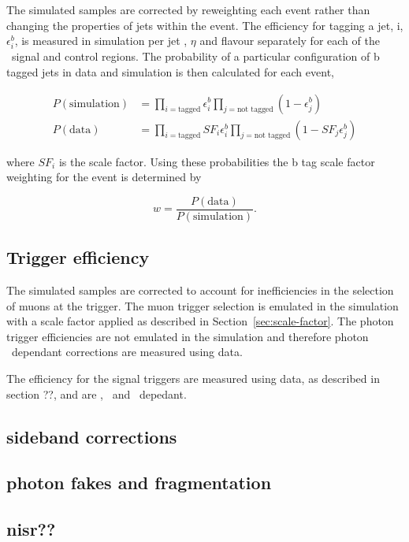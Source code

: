 The simulated samples are corrected by reweighting
each event rather than changing the properties of jets within the event. 
The efficiency for tagging a jet, i, $\epsilon_{i}^{b}$, is measured in simulation per 
jet \pt, $\eta$ and flavour separately for each of the 
\alphat~signal and control regions. The probability of a particular configuration 
of b tagged jets in data and simulation is then calculated for each event,

\begin{align}
P(\text{simulation}) &= \prod_{i=\text{tagged}} \epsilon^{b}_{i} \prod_{j=\text{not tagged}} (1-\epsilon^{b}_{j})\\
P(\text{data}) &= \prod_{i=\text{tagged}} SF_{i}\epsilon^{b}_{i} \prod_{j=\text{not tagged}} (1-SF_{j}\epsilon^{b}_{j})
\end{align}

where $SF_{i}$ is the scale factor. Using these probabilities the b tag scale factor weighting for the event is 
determined by

\begin{equation}
w = \frac{P(\text{data})}{P(\text{simulation})}.
\end{equation}

\subsection{Trigger efficiency}

The simulated samples are corrected to account for inefficiencies in the selection of muons
at the trigger. The muon trigger selection is emulated in the simulation with a scale factor
applied as described in Section~\ref{sec:scale-factor}. The photon trigger efficiencies
are not emulated in the simulation and therefore photon \pt~dependant corrections are measured 
using data. 

The efficiency for the signal triggers are measured using data, as described 
in section ??, and are \scalht, \njet~and \mht~depedant.

\subsection{sideband corrections}
\subsection{photon fakes and fragmentation}
\subsection{nisr??}
